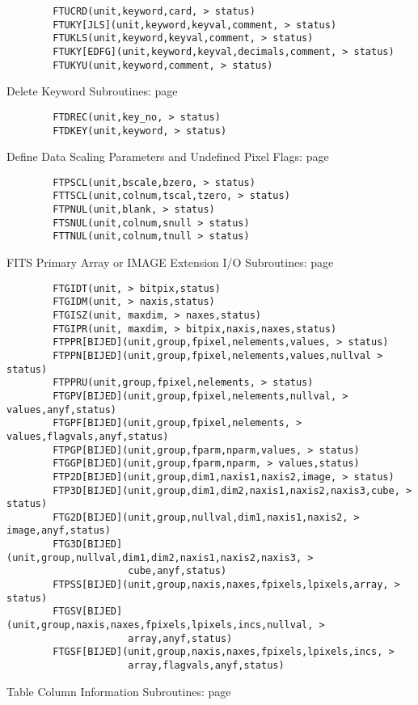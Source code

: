 \documentclass[11pt]{book}
\begin{document}
\begin{verbatim}
        FTUCRD(unit,keyword,card, > status)
        FTUKY[JLS](unit,keyword,keyval,comment, > status)
        FTUKLS(unit,keyword,keyval,comment, > status)
        FTUKY[EDFG](unit,keyword,keyval,decimals,comment, > status)
        FTUKYU(unit,keyword,comment, > status)
\end{verbatim}
 Delete Keyword Subroutines: page~\pageref{FTDREC}

\begin{verbatim}
        FTDREC(unit,key_no, > status)
        FTDKEY(unit,keyword, > status)
\end{verbatim}
 Define Data Scaling Parameters and Undefined Pixel Flags: page~\pageref{FTPSCL}

\begin{verbatim}
        FTPSCL(unit,bscale,bzero, > status)
        FTTSCL(unit,colnum,tscal,tzero, > status)
        FTPNUL(unit,blank, > status)
        FTSNUL(unit,colnum,snull > status)
        FTTNUL(unit,colnum,tnull > status)
\end{verbatim}
 FITS Primary Array or IMAGE Extension I/O Subroutines: page~\pageref{FTPPR}

\begin{verbatim}
        FTGIDT(unit, > bitpix,status)
        FTGIDM(unit, > naxis,status)
        FTGISZ(unit, maxdim, > naxes,status)
        FTGIPR(unit, maxdim, > bitpix,naxis,naxes,status)
        FTPPR[BIJED](unit,group,fpixel,nelements,values, > status)
        FTPPN[BIJED](unit,group,fpixel,nelements,values,nullval > status)
        FTPPRU(unit,group,fpixel,nelements, > status)
        FTGPV[BIJED](unit,group,fpixel,nelements,nullval, > values,anyf,status)
        FTGPF[BIJED](unit,group,fpixel,nelements, > values,flagvals,anyf,status)
        FTPGP[BIJED](unit,group,fparm,nparm,values, > status)
        FTGGP[BIJED](unit,group,fparm,nparm, > values,status)
        FTP2D[BIJED](unit,group,dim1,naxis1,naxis2,image, > status)
        FTP3D[BIJED](unit,group,dim1,dim2,naxis1,naxis2,naxis3,cube, > status)
        FTG2D[BIJED](unit,group,nullval,dim1,naxis1,naxis2, > image,anyf,status)
        FTG3D[BIJED](unit,group,nullval,dim1,dim2,naxis1,naxis2,naxis3, >
                     cube,anyf,status)
        FTPSS[BIJED](unit,group,naxis,naxes,fpixels,lpixels,array, > status)
        FTGSV[BIJED](unit,group,naxis,naxes,fpixels,lpixels,incs,nullval, >
                     array,anyf,status)
        FTGSF[BIJED](unit,group,naxis,naxes,fpixels,lpixels,incs, >
                     array,flagvals,anyf,status)
\end{verbatim}
 Table Column Information Subroutines: page~\pageref{FTGCNO}
\end{document}
